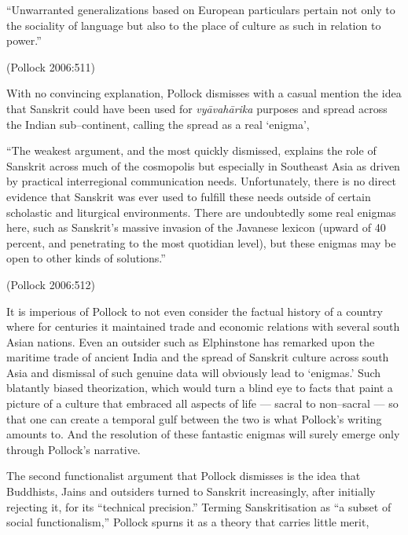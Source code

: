 \begin{myquote}
“Unwarranted generalizations based on European particulars pertain not only to the sociality of language but also to the place of culture as such in relation to power.”
\end{myquote}

\hfill (Pollock 2006:511)

With no convincing explanation, Pollock dismisses with a casual mention the idea that Sanskrit could have been used for \textit{vyāvahārika} purposes and spread across the Indian sub–continent, calling the spread as a real ‘enigma’,

\begin{myquote}
“The weakest argument, and the most quickly dismissed, explains the role of Sanskrit across much of the cosmopolis but especially in Southeast Asia as driven by practical interregional communication needs. Unfortunately, there is no direct evidence that Sanskrit was ever used to fulfill these needs outside of certain scholastic and liturgical environments. There are undoubtedly some real enigmas here, such as Sanskrit’s massive invasion of the Javanese lexicon (upward of 40 percent, and penetrating to the most quotidian level), but these enigmas may be open to other kinds of solutions.”
\end{myquote}

\hfill (Pollock 2006:512)

It is imperious of Pollock to not even consider the factual history of a country where for centuries it maintained trade and economic relations with several south Asian nations. Even an outsider such as Elphinstone has remarked upon the maritime trade of ancient India and the spread of Sanskrit culture across south Asia and dismissal of such genuine data will obviously lead to ‘enigmas.’ Such blatantly biased theorization, which would turn a blind eye to facts that paint a picture of a culture that embraced all aspects of life — sacral to non–sacral — so that one can create a temporal gulf between the two is what Pollock’s writing amounts to. And the resolution of these fantastic enigmas will surely emerge only through Pollock’s narrative.

The second functionalist argument that Pollock dismisses is the idea that Buddhists, Jains and outsiders turned to Sanskrit increasingly, after initially rejecting it, for its “technical precision.” Terming Sanskritisation as “a subset of social functionalism,” Pollock spurns it as a theory that carries little merit,

